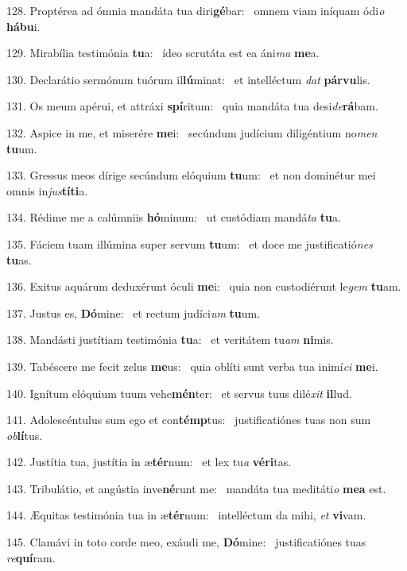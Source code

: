 128. Proptérea ad ómnia mandáta tua diri\textbf{gé}bar: \ast\  omnem viam iníquam ódi\textit{o} \textbf{há}\textbf{bu}i.\

129. Mirabília testimónia \textbf{tu}a: \ast\  ídeo scrutáta est ea áni\textit{ma} \textbf{me}a.\

130. Declarátio sermónum tuórum il\textbf{lú}minat: \ast\  et intelléctum \textit{dat} \textbf{pár}\textbf{vu}lis.\

131. Os meum apérui, et attráxi \textbf{spí}ritum: \ast\  quia mandáta tua desi\textit{de}\textbf{rá}bam.\

132. Aspice in me, et miserére \textbf{me}i: \ast\  secúndum judícium diligéntium no\textit{men} \textbf{tu}um.\

133. Gressus meos dírige secúndum elóquium \textbf{tu}um: \ast\  et non dominétur mei omnis in\textit{jus}\textbf{tí}\textbf{ti}a.\

134. Rédime me a calúmniis \textbf{hó}minum: \ast\  ut custódiam mandá\textit{ta} \textbf{tu}a.\

135. Fáciem tuam illúmina super servum \textbf{tu}um: \ast\  et doce me justificatió\textit{nes} \textbf{tu}as.\

136. Exitus aquárum deduxérunt óculi \textbf{me}i: \ast\  quia non custodiérunt le\textit{gem} \textbf{tu}am.\

137. Justus es, \textbf{Dó}mine: \ast\  et rectum judíci\textit{um} \textbf{tu}um.\

138. Mandásti justítiam testimónia \textbf{tu}a: \ast\  et veritátem tu\textit{am} \textbf{ni}mis.\

139. Tabéscere me fecit zelus \textbf{me}us: \ast\  quia oblíti sunt verba tua inimí\textit{ci} \textbf{me}i.\

140. Ignítum elóquium tuum vehe\textbf{mén}ter: \ast\  et servus tuus dilé\textit{xit} \textbf{il}lud.\

141. Adolescéntulus sum ego et con\textbf{témp}tus: \ast\  justificatiónes tuas non sum \textit{ob}\textbf{lí}tus.\

142. Justítia tua, justítia in æ\textbf{tér}num: \ast\  et lex tu\textit{a} \textbf{vé}\textbf{ri}tas.\

143. Tribulátio, et angústia inve\textbf{né}runt me: \ast\  mandáta tua meditáti\textit{o} \textbf{me}\textbf{a} est.\

144. Æquitas testimónia tua in æ\textbf{tér}num: \ast\  intelléctum da mihi, \textit{et} \textbf{vi}vam.\

145. Clamávi in toto corde meo, exáudi me, \textbf{Dó}mine: \ast\  justificatiónes tuas \textit{re}\textbf{quí}ram.\

